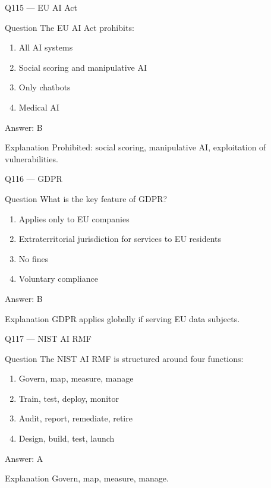 \documentclass[aspectratio=169,8pt]{beamer}
\begin{document}
	\begin{frame}{Q115 --- EU AI Act}
		\begin{block}{Question}
			The EU AI Act prohibits:
		\end{block}
		\begin{enumerate}
			\item All AI systems
			\item Social scoring and manipulative AI
			\item Only chatbots
			\item Medical AI
		\end{enumerate}
		\begin{exampleblock}{Answer: B}\end{exampleblock}
		\begin{block}{Explanation}
			Prohibited: social scoring, manipulative AI, exploitation of vulnerabilities.
		\end{block}
	\end{frame}
	
	\begin{frame}{Q116 --- GDPR}
		\begin{block}{Question}
			What is the key feature of GDPR?
		\end{block}
		\begin{enumerate}
			\item Applies only to EU companies
			\item Extraterritorial jurisdiction for services to EU residents
			\item No fines
			\item Voluntary compliance
		\end{enumerate}
		\begin{exampleblock}{Answer: B}\end{exampleblock}
		\begin{block}{Explanation}
			GDPR applies globally if serving EU data subjects.
		\end{block}
	\end{frame}
	
	\begin{frame}{Q117 --- NIST AI RMF}
		\begin{block}{Question}
			The NIST AI RMF is structured around four functions:
		\end{block}
		\begin{enumerate}
			\item Govern, map, measure, manage
			\item Train, test, deploy, monitor
			\item Audit, report, remediate, retire
			\item Design, build, test, launch
		\end{enumerate}
		\begin{exampleblock}{Answer: A}\end{exampleblock}
		\begin{block}{Explanation}
			Govern, map, measure, manage.
		\end{block}
	\end{frame}
	
\end{document}
